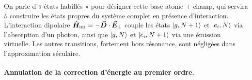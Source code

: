 On parle d’« états habillés » pour désigner cette base atome + champ, qui servira à construire 
les états propres du système complet en présence d’interaction. 
L’interaction dipolaire 
\( \hat{\bm{H}}_{\text{int}} = - \vec{{\bm{D}}} \cdot \vec{{\bm{E}}}_\perp \) 
couple les états \( \ket{g, N+1} \) et \( \ket{e_i, N} \) via l’absorption d’un photon, 
ainsi que \( \ket{g, N} \) et \( \ket{e_i, N+1} \) via une émission virtuelle. 
Les autres transitions, fortement hors résonance, sont négligées dans l’approximation séculaire.

\medskip

\paragraph{Annulation de la correction d’énergie au premier ordre.}

